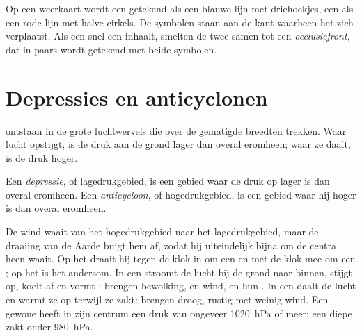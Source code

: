 Op een weerkaart wordt een  getekend als een blauwe lijn met
driehoekjes, een  als een rode lijn met halve cirkels. De
symbolen staan aan de kant waarheen het  zich verplaatst. Als een snel
 een  inhaalt, smelten de twee samen tot een
\emph{occlusiefront}, dat in paars wordt getekend met beide symbolen.

\section{Depressies en anticyclonen}

 ontstaan in de grote luchtwervels die over de gematigde breedten
trekken. Waar lucht opstijgt, is de druk aan de grond lager dan overal
eromheen; waar ze daalt, is de druk hoger.

\begin{definition}\label{def:g8:fronts-and-weather-maps:depression}
Een \emph{depressie}, of lagedrukgebied, is een
gebied waar de druk op  lager is dan overal eromheen. Een
\emph{anticycloon}, of hogedrukgebied, is een gebied
waar hij hoger is dan overal eromheen.
\end{definition}
\label{def:g8:fronts-and-weather-maps:anticyclone}

De wind waait van het hogedrukgebied naar het lagedrukgebied, maar de
draaiing van de Aarde buigt hem af, zodat hij uiteindelijk bijna om de
centra heen waait. Op het  draait hij tegen de klok in
om een  en met de klok mee om een ; op het  is het andersom. In een  stroomt de lucht bij de grond
naar binnen, stijgt op, koelt af en vormt :  brengen
bewolking,  en wind, en hun . In een  daalt de
lucht en warmt ze op terwijl ze zakt:  brengen droog, rustig
 met weinig wind. Een gewone  heeft in zijn centrum een druk
van ongeveer \qty{1020}{hPa} of meer; een diepe  zakt onder
\qty{980}{hPa}.


